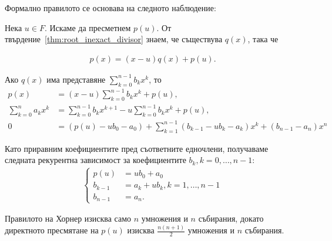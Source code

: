 \documentclass[numbers=endperiod, bibliography=totocnumbered]{scrartcl}
\begin{document}
Формално правилото се основава на следното наблюдение:

Нека \( u \in F \). Искаме да пресметнем \( p(u) \). От твърдение~\ref{thm:root_inexact_divisor} знаем, че съществува \( q(x) \), така че

\begin{align*}
  p(x) = (x - u) q(x) + p(u).
\end{align*}

Ако \( q(x) \) има представяне \( \sum_{k=0}^{n-1} b_k x^k \), то
\begin{align*}
  p(x)
  &=
  (x - u) \sum_{k=0}^{n-1} b_k x^k + p(u),
  \\
  \sum_{k=0}^n a_k x^k
  &=
  \sum_{k=0}^{n-1} b_k x^{k+1} - u \sum_{k=0}^{n-1} b_k x^k + p(u),
  \\
  0
  &=
  (p(u) - u b_0 - a_0) + \sum_{k=1}^{n-1} (b_{k-1} - u b_k - a_k) x^k + (b_{n-1} - a_n) x^n
\end{align*}

Като приравним коефициентите пред съответните едночлени, получаваме следната рекурентна зависимост за коефициентите \( b_k, k = 0, \ldots, n - 1 \):
\begin{align*}
  \begin{cases}
    p(u) &= u b_0 + a_0 \\
    b_{k-1} &= a_k + u b_k, k = 1, \ldots, n - 1 \\
    b_{n-1} &= a_n.
  \end{cases}
\end{align*}

Правилото на Хорнер изисква само \( n \) умножения и \( n \) събирания, докато директното пресмятане на \( p(u) \) изисква \( \frac {n(n+1)} 2 \) умножения и \( n \) събирания.
\end{document}

